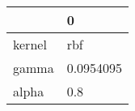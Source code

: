 \begin{tabular}{ll}
\toprule
{} &          0 \\
\midrule
kernel &        rbf \\
gamma  &  0.0954095 \\
alpha  &        0.8 \\
\bottomrule
\end{tabular}
